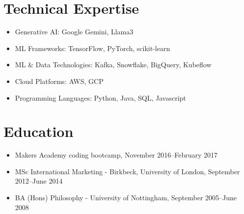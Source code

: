 \documentclass[a4paper]{scrartcl}
\begin{document}
\section*{Technical Expertise}
\begin{itemize}
	\item Generative AI: Google Gemini, Llama3
	\item ML Frameworks: TensorFlow, PyTorch, scikit-learn
	\item ML \& Data Technologies: Kafka, Snowflake, BigQuery, Kubeflow
	\item Cloud Platforms: AWS, GCP
	\item Programming Languages: Python, Java, SQL, Javascript
\end{itemize}

\section*{Education}
\begin{itemize}
	\item Makers Academy coding bootcamp, November 2016--February 2017
	\item MSc International Marketing - Birkbeck, University of London, September 2012--June 2014
	\item BA (Hons) Philosophy - University of Nottingham, September 2005--June 2008
\end{itemize}
\end{document}
